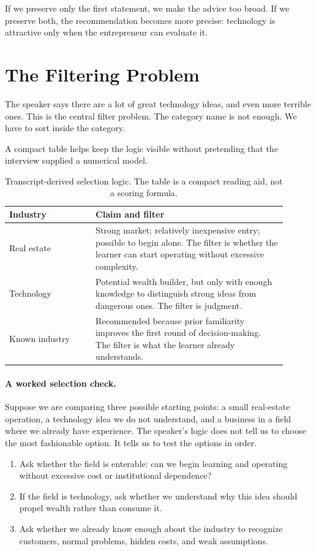 If we preserve only the first statement, we make the advice too broad. If we preserve both, the recommendation becomes more precise: technology is attractive only when the entrepreneur can evaluate it.

\section{The Filtering Problem}

The speaker says there are a lot of great technology ideas, and even more terrible ones. This is the central filter problem. The category name is not enough. We have to sort inside the category.

A compact table helps keep the logic visible without pretending that the interview supplied a numerical model.

\begin{table}
\centering
\begin{tabular}{p{0.28\linewidth} p{0.62\linewidth}}
\hline
Industry & Claim and filter \\
\hline
Real estate & Strong market; relatively inexpensive entry; possible to begin alone. The filter is whether the learner can start operating without excessive complexity. \\
Technology & Potential wealth builder, but only with enough knowledge to distinguish strong ideas from dangerous ones. The filter is judgment. \\
Known industry & Recommended because prior familiarity improves the first round of decision-making. The filter is what the learner already understands. \\
\hline
\end{tabular}
\caption{Transcript-derived selection logic. The table is a compact reading aid, not a scoring formula.}
\end{table}

\paragraph{A worked selection check.}
Suppose we are comparing three possible starting points: a small real-estate operation, a technology idea we do not understand, and a business in a field where we already have experience. The speaker's logic does not tell us to choose the most fashionable option. It tells us to test the options in order.

\begin{enumerate}
\item Ask whether the field is enterable: can we begin learning and operating without excessive cost or institutional dependence?
\item If the field is technology, ask whether we understand why this idea should propel wealth rather than consume it.
\item Ask whether we already know enough about the industry to recognize customers, normal problems, hidden costs, and weak assumptions.
\end{enumerate}

